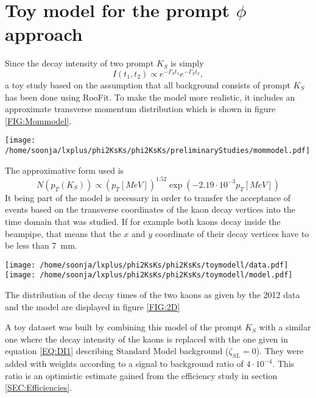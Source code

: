 \section{Toy model for the prompt $\phi$ approach}
Since the decay intensity of two prompt $K_S$ is simply 
\begin{equation}
I(t_1,t_2) \propto e^{-\Gamma_S t_1}e^{-\Gamma_S t_2}, 
\end{equation} 
a toy study based on the assumption that all background consists of prompt $K_S$ has been done using RooFit. To make the model more realistic, it includes an approximate transverse momentum distribution which is shown in figure \ref{FIG:Mommodel}. 

\begin{center}
\texttt{[image: /home/soonja/lxplus/phi2KsKs/phi2KsKs/preliminaryStudies/mommodel.pdf]}
\label{FIG:Mommodel}
\end{center}

The approximative form used is
\begin{equation}
N(p_T(K_S)) \propto 
(p_T[MeV])^{1.52}\exp\left(-2.19\cdot10^{-3}p_T[MeV]\right) 
\end{equation}
It being part of the model is necessary in order to transfer the acceptance of events based on the transverse coordinates of the kaon decay vertices into the time domain that was studied. If for example both kaons decay inside the beampipe, that means that the $x$ and $y$ coordinate of their decay vertices have to be less than \SI{7}{mm}.

\begin{center}
\texttt{[image: /home/soonja/lxplus/phi2KsKs/phi2KsKs/toymodell/data.pdf]}
\texttt{[image: /home/soonja/lxplus/phi2KsKs/phi2KsKs/toymodell/model.pdf]}
\label{FIG:2D}
\end{center}

The distribution of the decay times of the two kaons as given by the 2012 data and the model are displayed in figure \ref{FIG:2D}




A toy dataset was built by combining this model of the prompt $K_S$ with a similar one where the decay intensity of the kaons is replaced with the one given in equation \eqref{EQ:DI1} describing Standard Model background ($\zeta_{SL}=0$). They were added with weights according to a signal to background ratio of $4\cdot10^{-4}$. This ratio is an optimistic estimate gained from the efficiency study in section  \ref{SEC:Efficiencies}.



